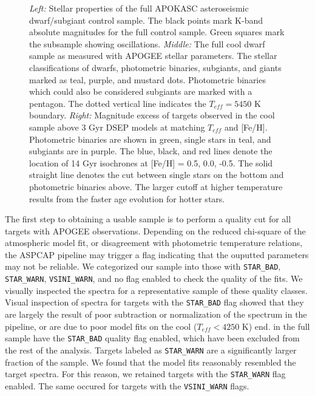 \documentclass[manuscript]{aastex6}
\newcommand{\Teff}{\ensuremath{T_{eff}}}
\newcommand{\STARBAD}{\texttt{STAR\_BAD}}
\newcommand{\STARWARN}{\texttt{STAR\_WARN}}
\newcommand{\VSINIWARN}{\texttt{VSINI\_WARN}}
\newcommand{\gvs}{\authorcomment1}
\begin{document}
\begin{figure*}
    \caption{\emph{Left:} Stellar properties of the full APOKASC 
    asteroseismic dwarf/subgiant control sample. The black points mark
    K-band absolute magnitudes for the full control sample. Green squares mark
    the subsample showing oscillations. 
    \emph{Middle:} The full cool dwarf sample as measured with APOGEE stellar 
    parameters. The stellar classifications of dwarfs, photometric binaries, 
    subgiants, and giants marked as teal, purple, and mustard
    dots. Photometric binaries which could also be considered subgiants are
    marked with a pentagon.  The dotted vertical line indicates the 
    \(\Teff = 5450\) K boundary.
    \emph{Right:} Magnitude excess of targets observed in the cool 
    sample above 3 Gyr DSEP models at matching \Teff{} and 
    [Fe/H]. Photometric binaries are shown in green, single stars in teal, and
    subgiants are in purple. The blue, black, and red lines denote the location of 14 Gyr
    isochrones at [Fe/H] = 0.5, 0.0, -0.5. The solid straight line denotes the 
    cut between single stars on the bottom and photometric binaries
above. The larger cutoff at higher temperature results from the faster age
evolution for hotter stars.\label{fig:sample}}
\end{figure*}

The first step to obtaining a usable sample is to perform a 
quality cut for all targets with APOGEE observations.
Depending on the reduced chi-square of the atmospheric model fit, or
disagreement with photometric temperature relations, the ASPCAP pipeline
may trigger a flag indicating that the ouputted parameters may not be
reliable. We categorized our sample into those with \STARBAD, \STARWARN,
\VSINIWARN{}, and no flag enabled to check the quality of the fits. We
visually inspected the spectra for a representative sample of these
quality classes. 
Visual inspection of spectra for targets with the \STARBAD{} flag showed that they are 
largely the result of poor subtraction or normalization of the spectrum in the
pipeline, or are due to poor model fits on the cool (\(\Teff < 4250\) K) end. 
\gvs{Calculate percentage} in the full sample have the \STARBAD{} quality 
flag enabled, which have been excluded from the rest of the analysis. 
Targets labeled as \STARWARN{} are a significantly larger fraction of the 
sample. We found that the model fits reasonably resembled the target spectra. 
For this reason, we retained targets with the \STARWARN{} flag enabled. The 
same occured for targets with the \VSINIWARN{} flags.
\end{document}
